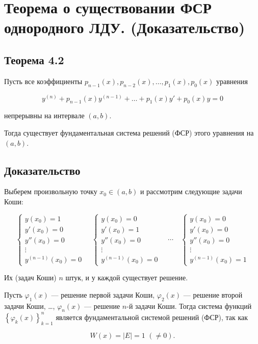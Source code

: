 {
	\section{Теорема о существовании ФСР однородного ЛДУ. (Доказательство)}

	\subsection*{Теорема 4.2}

	Пусть все коэффициенты \( p_{n-1}(x), p_{n-2}(x), \ldots, p_1(x), p_0(x) \) уравнения


	\[
	y^{(n)} + p_{n-1}(x)y^{(n-1)} + \ldots + p_1(x)y' + p_0(x)y = 0 \tag{4.1}
	\]


	непрерывны на интервале \( (a, b) \).

	Тогда существует фундаментальная система решений (ФСР) этого уравнения на \( (a, b) \).

	\subsection*{Доказательство}

	Выберем произвольную точку \( x_0 \in (a, b) \) и рассмотрим следующие задачи Коши:



	\[
	\begin{cases}
	y(x_0) = 1 \\
	y'(x_0) = 0 \\
	y''(x_0) = 0 \\
	\vdots \\
	y^{(n-1)}(x_0) = 0
	\end{cases}
	\quad
	\begin{cases}
	y(x_0) = 0 \\
	y'(x_0) = 1 \\
	y''(x_0) = 0 \\
	\vdots \\
	y^{(n-1)}(x_0) = 0
	\end{cases}
	\quad
	\cdots
	\quad
	\begin{cases}
	y(x_0) = 0 \\
	y'(x_0) = 0 \\
	y''(x_0) = 0 \\
	\vdots \\
	y^{(n-1)}(x_0) = 1
	\end{cases}
	\]


	Их (задач Коши) \( n \) штук, и у каждой существует решение.

	Пусть \( \varphi_1(x) \) — решение первой задачи Коши, \( \varphi_2(x) \) — решение второй задачи Коши, \ldots, \( \varphi_n(x) \) — решение \( n \)-й задачи Коши. Тогда система функций \( \left\{ \varphi_k(x) \right\}_{k=1}^{n} \) является фундаментальной системой решений (ФСР), так как



	\[
	W(x) = |E| = 1 \,\, (\neq 0).
	\]

	\newpage
}